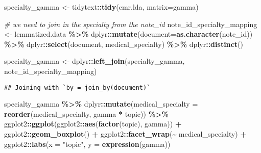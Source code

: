 \documentclass[
]{article}
\newenvironment{Shaded}{\begin{snugshade}}{\end{snugshade}}
\newcommand{\AttributeTok}[1]{\textcolor[rgb]{0.13,0.29,0.53}{#1}}
\newcommand{\CommentTok}[1]{\textcolor[rgb]{0.56,0.35,0.01}{\textit{#1}}}
\newcommand{\FunctionTok}[1]{\textcolor[rgb]{0.13,0.29,0.53}{\textbf{#1}}}
\newcommand{\NormalTok}[1]{#1}
\newcommand{\OtherTok}[1]{\textcolor[rgb]{0.56,0.35,0.01}{#1}}
\newcommand{\SpecialCharTok}[1]{\textcolor[rgb]{0.81,0.36,0.00}{\textbf{#1}}}
\newcommand{\StringTok}[1]{\textcolor[rgb]{0.31,0.60,0.02}{#1}}
\begin{document}
\begin{Shaded}
\begin{Highlighting}[]
\NormalTok{specialty\_gamma }\OtherTok{\textless{}{-}}\NormalTok{ tidytext}\SpecialCharTok{::}\FunctionTok{tidy}\NormalTok{(emr.lda, }\AttributeTok{matrix=}\StringTok{\textquotesingle{}gamma\textquotesingle{}}\NormalTok{)}

\CommentTok{\# we need to join in the specialty from the note\_id}
\NormalTok{note\_id\_specialty\_mapping }\OtherTok{\textless{}{-}}\NormalTok{ lemmatized.data }\SpecialCharTok{\%\textgreater{}\%}
\NormalTok{  dplyr}\SpecialCharTok{::}\FunctionTok{mutate}\NormalTok{(}\AttributeTok{document=}\FunctionTok{as.character}\NormalTok{(note\_id)) }\SpecialCharTok{\%\textgreater{}\%} 
\NormalTok{  dplyr}\SpecialCharTok{::}\FunctionTok{select}\NormalTok{(document, medical\_specialty) }\SpecialCharTok{\%\textgreater{}\%} 
\NormalTok{  dplyr}\SpecialCharTok{::}\FunctionTok{distinct}\NormalTok{()}

\NormalTok{specialty\_gamma }\OtherTok{\textless{}{-}}\NormalTok{ dplyr}\SpecialCharTok{::}\FunctionTok{left\_join}\NormalTok{(specialty\_gamma, note\_id\_specialty\_mapping)}
\end{Highlighting}
\end{Shaded}

\begin{verbatim}
## Joining with `by = join_by(document)`
\end{verbatim}

\begin{Shaded}
\begin{Highlighting}[]
\NormalTok{specialty\_gamma }\SpecialCharTok{\%\textgreater{}\%}
\NormalTok{  dplyr}\SpecialCharTok{::}\FunctionTok{mutate}\NormalTok{(}\AttributeTok{medical\_specialty =} \FunctionTok{reorder}\NormalTok{(medical\_specialty, gamma }\SpecialCharTok{*}\NormalTok{ topic)) }\SpecialCharTok{\%\textgreater{}\%}
\NormalTok{  ggplot2}\SpecialCharTok{::}\FunctionTok{ggplot}\NormalTok{(ggplot2}\SpecialCharTok{::}\FunctionTok{aes}\NormalTok{(}\FunctionTok{factor}\NormalTok{(topic), gamma)) }\SpecialCharTok{+}
\NormalTok{  ggplot2}\SpecialCharTok{::}\FunctionTok{geom\_boxplot}\NormalTok{() }\SpecialCharTok{+}
\NormalTok{  ggplot2}\SpecialCharTok{::}\FunctionTok{facet\_wrap}\NormalTok{(}\SpecialCharTok{\textasciitilde{}}\NormalTok{ medical\_specialty) }\SpecialCharTok{+}
\NormalTok{  ggplot2}\SpecialCharTok{::}\FunctionTok{labs}\NormalTok{(}\AttributeTok{x =} \StringTok{"topic"}\NormalTok{, }\AttributeTok{y =} \FunctionTok{expression}\NormalTok{(gamma))}
\end{Highlighting}
\end{Shaded}
\end{document}
